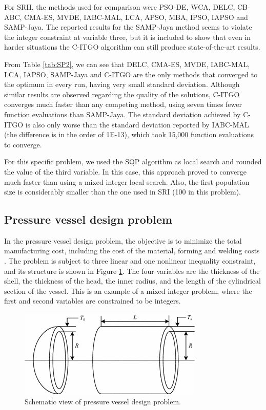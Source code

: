 For SRII, the methods used for comparison were PSO-DE, WCA, DELC, CB-ABC, CMA-ES, MVDE, IABC-MAL, LCA, APSO, MBA, IPSO, IAPSO and SAMP-Jaya. The reported results for the SAMP-Jaya method seems to violate the integer constraint at variable three, but it is included to show that even in harder situations the C-ITGO algorithm can still produce state-of-the-art results.

From Table \ref{tab:SP2}, we can see that DELC, CMA-ES, MVDE, IABC-MAL, LCA, IAPSO, SAMP-Jaya and C-ITGO are the only methods that converged to the optimum in every run, having very small standard deviation. Although similar results are observed regarding the quality of the solutions, C-ITGO converges much faster than any competing method, using seven times fewer function evaluations than SAMP-Jaya. The standard deviation achieved by C-ITGO is also only worse than the standard deviation reported by IABC-MAL (the difference is in the order of 1E-13), which took 15,000 function evaluations to converge.



For this specific problem, we used the SQP algorithm as local search and rounded the value of the third variable. In this case, this approach proved to converge much faster than using a mixed integer local search. Also, the first population size is considerably smaller than the one used in SRI (100 in this problem).



\subsection{Pressure vessel design problem}

In the pressure vessel design problem, the objective is to minimize the total manufacturing cost, including the cost of the material, forming and welding costs \citep{PV}. The problem is subject to three linear and one nonlinear inequality constraint, and its structure is shown in Figure \ref{fig:PV}. The four variables are the thickness of the shell, the thickness of the head, the inner radius, and the length of the cylindrical section of the vessel. This is an example of a mixed integer problem, where the first and second variables are constrained to be integers.


\begin{figure}[h]
\begin{center}
\includegraphics[scale=0.6]{Imgs/PV.png}
\end{center}
\captionsetup{justification=centering}
\caption{Schematic view of pressure vessel design problem.}\label{fig:PV}
\end{figure}


